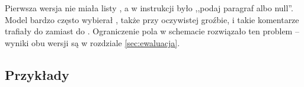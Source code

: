 
Pierwsza wersja nie miała listy , a w instrukcji było ,,podaj paragraf albo null''. Model bardzo często
wybierał , także przy oczywistej groźbie, i takie komentarze trafiały do  zamiast do
. Ograniczenie pola w schemacie rozwiązało ten problem -- wyniki obu wersji są w rozdziale
\ref{sec:ewaluacja}.

\subsection{Przykłady}


